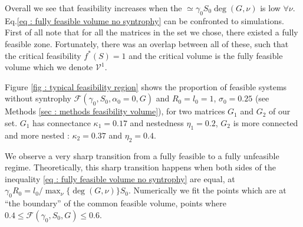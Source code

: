 \documentclass[12pt, titlepage]{report}
\begin{document}
Overall we see that feasibility increases when the  $\simeq \gamma_0 S_0 \deg(G,\nu) $ is low $\forall \nu$.
Eq.\eqref{eq : fully feasible volume no syntrophy} can be confronted to simulations. First of all note that for all the matrices in the set we chose, there existed a fully feasible zone. Fortunately, there was an overlap between all of these, such that the critical feasibility $f^*(S)=1$ and the critical volume is the fully feasible volume which we denote $\mathcal{V}^1$.

 Figure \ref{fig : typical feasibility region} shows the proportion of feasible systems without syntrophy $\mathcal{F}(\gamma_0, S_0, \alpha_0=0, G)$ and $R_0=l_0=1$, $\sigma_0=0.25$ (see Methods \ref{sec : methods feasibility volume}), for two matrices $G_1$ and $G_2$ of our set. $G_1$ has connectance $\kappa_1=0.17$ and nestedness $\eta_1=0.2$, $G_2$ is more connected and more nested : $\kappa_2=0.37$ and $\eta_2=0.4$.

We observe a very sharp transition from a fully feasible to a fully unfeasible regime. Theoretically, this sharp transition happens when both sides of the inequality \eqref{eq : fully feasible volume no syntrophy} are equal, \ie at $\gamma_0 R_0 = l_0/\max_\nu\{\deg(G,\nu)\}S_0$.
 Numerically we fit the points which are at ``the boundary'' of the common feasible volume, \ie points where $0.4 \leq \mathcal{F}(\gamma_0, S_0, G) \leq 0.6$.
\end{document}

